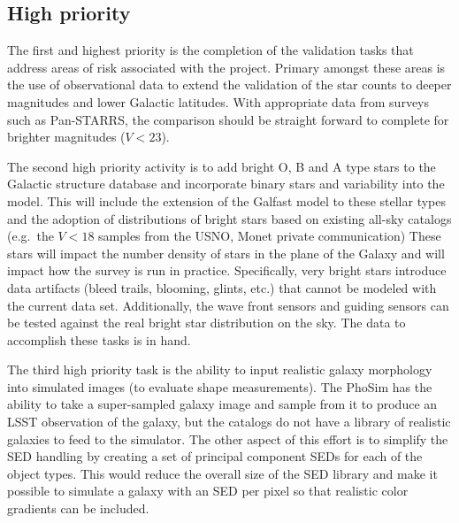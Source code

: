 \documentclass[11pt]{article}
\begin{document}
\subsection{High priority}
The first and highest priority is the completion of the validation
tasks that address areas of risk associated with the project. Primary
amongst these areas is the use of observational data to extend the
validation of the star counts to deeper magnitudes and lower Galactic
latitudes.  With appropriate data from surveys such as
Pan-STARRS, %
the comparison should be straight forward to complete for brighter
magnitudes ($V<23$).

The second high priority activity is to add bright O, B and A type
stars to the Galactic structure database and incorporate binary stars
and variability into the model.  This will include the extension of
the Galfast model to these stellar types and the adoption of
distributions of bright stars based on existing all-sky catalogs
(e.g.\ the $V<18$ samples from the USNO, Monet private communication)
These stars will impact the number density of stars in the plane of
the Galaxy and will impact how the survey is run in practice.
Specifically, very bright stars introduce data artifacts (bleed
trails, blooming, glints, etc.) that cannot be modeled with the
current data set.  Additionally, the wave front sensors and guiding
sensors can be tested against the real bright star distribution on the
sky. The data to accomplish these tasks is in hand.

The third high priority task is the ability to input realistic galaxy
morphology into simulated images (to evaluate shape measurements).
The PhoSim has the ability to take a super-sampled galaxy image and
sample from it to produce an LSST observation of the galaxy, but the
catalogs do not have a library of realistic galaxies to feed to the
simulator.  The other aspect of this effort is to simplify the SED
handling by creating a set of principal component SEDs for each of the
object types.  This would reduce the overall size of the SED library
and make it possible to simulate a galaxy with an SED per pixel so
that realistic color gradients can be included.
\end{document}

